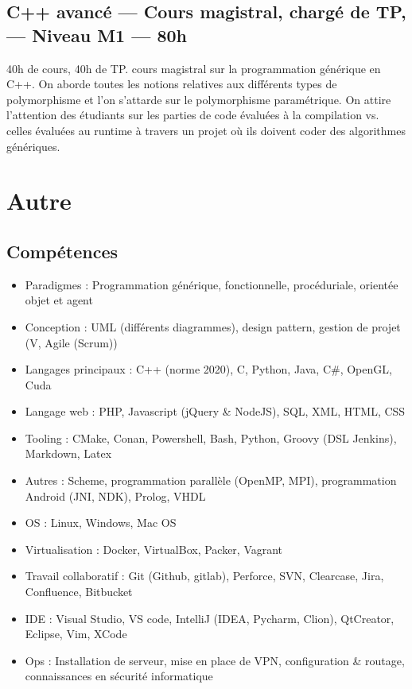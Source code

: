 \documentclass[11pt,a4paper,sans]{article} %
\begin{document}
\subsection{C++ avancé --- Cours magistral, chargé de TP, --- Niveau M1 --- 80h}

40h de cours, 40h de TP. cours magistral sur la programmation générique en C++. On aborde toutes les
notions relatives aux différents types de polymorphisme et l'on s'attarde sur le polymorphisme paramétrique. On attire
l'attention des étudiants sur les parties de code évaluées à la compilation vs. celles évaluées au runtime à travers un
projet où ils doivent coder des algorithmes génériques.

\section{Autre}

\subsection{Compétences}

\begin{itemize}
  \item Paradigmes : Programmation générique, fonctionnelle, procéduriale, orientée objet et agent
  \item Conception : UML (différents diagrammes), design pattern, gestion de projet (V, Agile (Scrum))
  \item Langages principaux : C++ (norme 2020), C, Python, Java, C\#, OpenGL, Cuda
  \item Langage web : PHP, Javascript (jQuery \& NodeJS), SQL, XML, HTML, CSS
  \item Tooling : CMake, Conan, Powershell, Bash, Python, Groovy (DSL Jenkins), Markdown, Latex
  \item Autres : Scheme, programmation parallèle (OpenMP, MPI), programmation Android (JNI, NDK), Prolog, VHDL
  \item OS : Linux, Windows, Mac OS
  \item Virtualisation : Docker, VirtualBox, Packer, Vagrant
  \item Travail collaboratif : Git (Github, gitlab), Perforce, SVN, Clearcase, Jira, Confluence, Bitbucket
  \item IDE : Visual Studio, VS code, IntelliJ (IDEA, Pycharm, Clion), QtCreator, Eclipse, Vim, XCode
  \item Ops : Installation de serveur,  mise en place de VPN, configuration \& routage, connaissances en sécurité informatique
\end{itemize}
\end{document}
